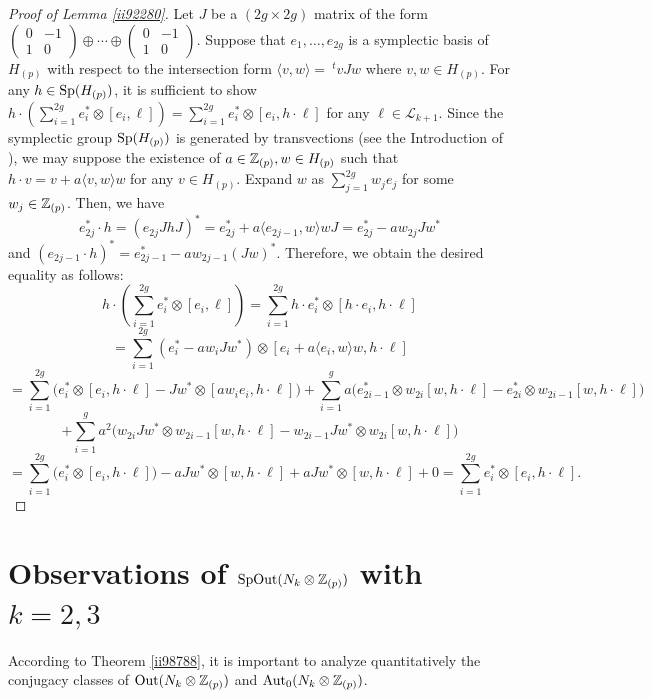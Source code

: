 \documentclass{article}
\theoremstyle{plain}
\theoremstyle{definition}
\newcommand{\Z}{{\Bbb Z}}
\newcommand{\Sp}{{\rm Sp}}
\begin{document}
{\begin{proof}
[Proof of Lemma \ref{ii92280}] Let $J$ be a $(2g \times 2g)$ matrix of the form $\begin{pmatrix}0 & -1 \\1 & 0 \end{pmatrix} \oplus \cdots \oplus \begin{pmatrix}0 & -1 \\1 & 0 \end{pmatrix}.$ Suppose that $e_1, \dots, e_{2g}$ is a symplectic basis of $H_{(p)}$ with respect to the intersection form $\langle v,w\rangle= \ ^t v J w $ where $v,w \in H_{(p)}$. For any $ h \in \Sp(H_{(p)}) $, it is sufficient to show $ h \cdot (\sum_{i=1}^{2g} e_i^* \otimes [e_i, \ell ] )= \sum_{i=1}^{2g} e_i^* \otimes [e_i, h \cdot \ell ] $ for any $\ell \in \mathcal{L}_{k+1}$. Since the symplectic group $\Sp(H_{(p)}) $ is generated by transvections (see the Introduction of \cite{Ch}), we may suppose the existence of $a \in \Z_{(p)}, w \in H_{(p)}$ such that $h \cdot v = v + a \langle v,w \rangle w$ for any $v \in H_{(p)}$. Expand $w$ as $\sum_{j=1}^{2g}w_j e_j$ for some $w_j \in \Z_{(p)}$. Then, we have
\[e_{2j}^*\cdot h = (e_{2j} J h J)^* = e_{2j}^* + a \langle e_{2j-1},w \rangle w J= e_{2j}^* - a w_{2j} J w^*\]
and $(e_{2j-1} \cdot h )^* = e_{2j-1}^* - a w_{2j-1} (J w)^* $. Therefore, we obtain the desired equality as follows:
\[ h \cdot (\sum_{i=1}^{2g} e_i^* \otimes [e_i, \ell ] ) =
\sum_{i=1}^{2g} h \cdot e_i^* \otimes [h \cdot e_i, h \cdot \ell]  \]
\[ = \sum_{i=1}^{2g} (e_i^* - a w_i J w^*) \otimes [ e_i + a \langle e_i,w \rangle w , h \cdot \ell] \]
\[ = \sum_{i=1}^{2g} \bigl(e_i^* \otimes [e_i, h \cdot \ell ] - J w^* \otimes [a w_i e_i, h \cdot \ell ] \bigr)+\sum_{i=1}^{g} a \bigl(e_{2i-1}^* \otimes w_{2i}[w, h \cdot \ell] -e_{2i}^* \otimes w_{2i-1}[w, h \cdot \ell] \bigr) \]
\[
+ \sum_{i=1}^{g} a ^2 \bigl(w_{2i} J w ^* \otimes w_{2i-1}[w, h \cdot \ell] - w_{2i-1} J w ^* \otimes w_{2i}[w, h \cdot \ell] \bigr) \]
\[ = \sum_{i=1}^{2g} \bigl(e_i^* \otimes [e_i, h \cdot \ell ] \bigr) -a J w^* \otimes [w, h \cdot \ell ] +a J w^* \otimes [w, h \cdot \ell ] + 0 = \sum_{i=1}^{2g} e_i^* \otimes [e_i, h \cdot \ell ] .\]
\end{proof}

\section{Observations of $\mathrm{SpOut}(N_k \otimes \Z_{(p)})$ with $k=2,3$}
\label{99sec}
According to Theorem \ref{ii98788}, it is important to analyze quantitatively the conjugacy classes of $\mathrm{Out}(N_k \otimes \Z_{(p)})$ and $\mathrm{Aut}_0(N_k \otimes \Z_{(p)})$.

}
\end{document}
